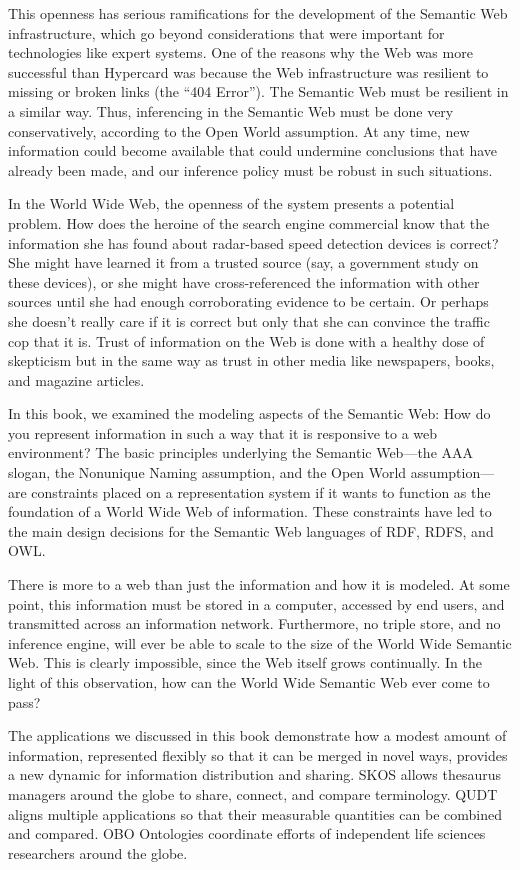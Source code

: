 This openness has serious ramifications for  the development of the Semantic Web infrastructure, which go
beyond considerations that were important for technologies like expert
systems. One of the reasons why the Web was more successful than
Hypercard was because the Web infrastructure was resilient to missing or
broken links (the ``404 Error''). The Semantic Web must be resilient in
a similar way. Thus, inferencing in the Semantic Web must be done very
conservatively, according to the Open World assumption. At any time, new
information could become available that could undermine conclusions that
have already been made, and our inference policy must be robust in such
situations.

In the World Wide Web, the openness of the system presents a potential
problem. How does the heroine of the search engine commercial know that
the information she has found about radar-based speed detection devices is correct? She might have learned it from a
trusted source (say, a government study on these devices), or she might
have cross-referenced the information with other sources until she had
enough corroborating evidence to be certain. Or perhaps she doesn't
really care if it is correct but only that she can convince the traffic
cop that it is. Trust of information on the Web is done with a healthy
dose of skepticism but in the same way as trust in other media like
newspapers, books, and magazine articles.

In this book, we examined the modeling aspects of the Semantic Web: How
do you represent information in such a way that it is responsive to a
web environment? The basic principles underlying the Semantic Web---the
AAA slogan, the Nonunique Naming assumption, and the Open World
assumption---are constraints placed on a representation system if it
wants to function as the foundation of a World Wide Web of information.
These constraints have led to the main design decisions for the Semantic
Web languages of RDF, RDFS, and OWL.

There is more to a web than just the information and how it is modeled.
At some point, this information must be stored in a computer, accessed
by end users, and transmitted across an information network.
Furthermore, no triple store, and no inference engine, will ever be able
to scale to the size of the World Wide Semantic Web. This is clearly
impossible, since the Web itself grows continually. In the light of this
observation, how can the World Wide Semantic Web ever come to pass?

The applications we discussed in this book demonstrate how a modest
amount of information, represented flexibly so that it can be merged in
novel ways, provides a new dynamic for information distribution and
sharing. SKOS allows thesaurus managers around the globe to share,
connect, and compare terminology. QUDT aligns multiple applications so
that their measurable quantities can be combined and compared. OBO
Ontologies coordinate efforts of independent life sciences researchers
around the globe.


